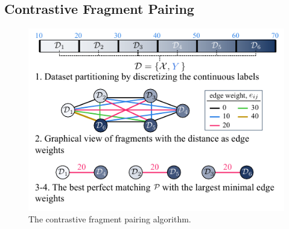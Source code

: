 \documentclass{article}
\theoremstyle{plain}
\theoremstyle{definition}
\theoremstyle{remark}
\begin{document}


\subsection{Contrastive Fragment Pairing}\label{subsec:fragmentation}

\begin{figure}
\begin{center}
\vskip -0.1in
\centerline{\includegraphics[width=0.5\columnwidth]{imgs/cont_fragment_neurips.pdf}}
\caption{The contrastive fragment pairing algorithm.} %
\label{fig:contrastive_fragmentation}
\end{center}
\vskip -0.3in
\end{figure}
\end{document}
